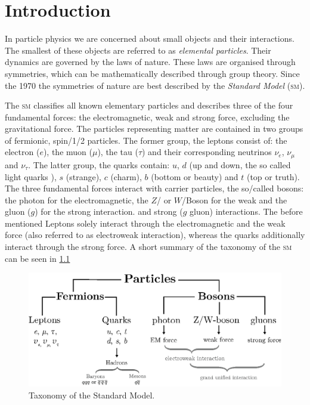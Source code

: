 \documentclass[../../index.tex]{subfiles}
\begin{document}
\chapter{Introduction}
In particle physics we are concerned about small objects and their interactions.
The smallest of these objects are referred to as \textit{elemental particles}.
Their dynamics are governed by the laws of nature. These laws are organised
through symmetries, which can be mathematically described through group theory.
Since the 1970 the symmetries of nature are best described by the
\textit{Standard Model} (\textsc{sm}).


The \textsc{sm} classifies all known elementary particles and describes three of
the four fundamental forces: the electromagnetic, weak and strong force,
excluding the gravitational force. The particles representing matter are
contained in two groups of fermionic, spin\-/1/2 particles. The former group,
the leptons consist of: the electron ($e$), the muon ($\mu$), the tau ($\tau$)
and their corresponding neutrinos $\nu_e$, $\nu_\mu$ and $\nu_\tau$. The latter
group, the quarks contain: $u$, $d$ (up and down, the so called light quarks ),
$s$ (strange), $c$ (charm), $b$ (bottom or beauty) and $t$ (top or truth). The
three fundamental forces interact with carrier particles, the so\-/called
bosons: the photon for the electromagnetic, the $Z$\-/ or $W$\-/Boson for the
weak and the gluon ($g$) for the strong interaction. and strong ($g$ gluon)
interactions. The before mentioned Leptons solely interact through the
electromagnetic and the weak force (also referred to as electroweak
interaction), whereas the quarks additionally interact through the strong force.
A short summary of the taxonomy of the \textsc{sm} can be seen in
\cref{fig:SMTaxonomy}
\begin{figure}
  \centering
  \includegraphics[width=\textwidth]{./images/standardModelTaxonomy.eps}
  \caption{Taxonomy of the Standard Model.}
  \label{fig:SMTaxonomy}
\end{figure}
\end{document}
